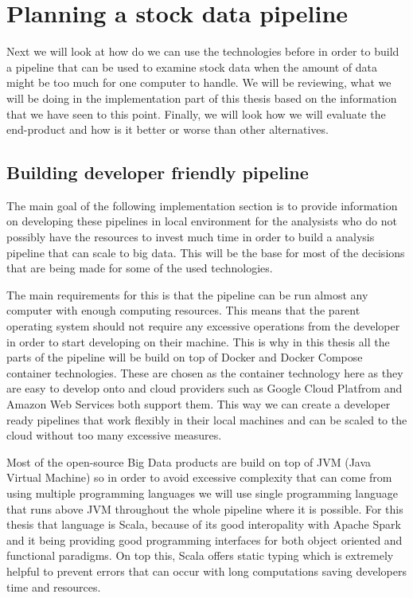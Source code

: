 \chapter{Planning a stock data pipeline}
\label{chapter:methods}


Next we will look at how do we can use the technologies before in order to build a pipeline that can be used to examine stock data when the amount of data might be too much for one computer to handle.
We will be reviewing, what we will be doing in the implementation part of this thesis based on the information that we have seen to this point.
Finally, we will look how we will evaluate the end-product and how is it better or worse than other alternatives.

\section{Building developer friendly pipeline}

The main goal of the following implementation section is to provide information on developing these pipelines in local environment for the analysists who do not possibly have the resources to invest much time in order to build a analysis pipeline that can scale to big data.
This will be the base for most of the decisions that are being made for some of the used technologies.

The main requirements for this is that the pipeline can be run almost any computer with enough computing resources.
This means that the parent operating system should not require any excessive operations from the developer in order to start developing on their machine.
This is why in this thesis all the parts of the pipeline will be build on top of Docker and Docker Compose container technologies.
These are chosen as the container technology here as they are easy to develop onto and cloud providers such as Google Cloud Platfrom and Amazon Web Services both support them. \cite{awsdocker} \cite{gcpdocker}
This way we can create a developer ready pipelines that work flexibly in their local machines and can be scaled to the cloud without too many excessive measures.

Most of the open-source Big Data products are build on top of JVM (Java Virtual Machine) so in order to avoid excessive complexity that can come from using multiple programming languages we will use single programming language that runs above JVM throughout the whole pipeline where it is possible.
For this thesis that language is Scala, because of its good interopality with Apache Spark and it being providing good programming interfaces for both object oriented and functional paradigms.
On top this, Scala offers static typing which is extremely helpful to prevent errors that can occur with long computations saving developers time and resources. \cite{scalabook}

